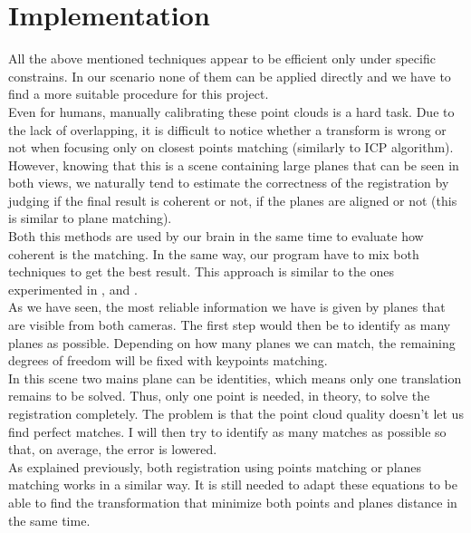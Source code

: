 
\chapter{Implementation} \label{chapt:implementation}

All the above mentioned techniques appear to be efficient only under specific constrains. In our scenario none of them can be applied directly and we have to find a more suitable procedure for this project. \\
Even for humans, manually calibrating these point clouds is a hard task. Due to the lack of overlapping, it is difficult to notice whether a transform is wrong or not when focusing only on closest points matching (similarly to ICP algorithm). However, knowing that this is a scene containing large planes that can be seen in both views, we naturally tend to estimate the correctness of the registration by judging if the final result is coherent or not, if the planes are aligned or not (this is similar to plane matching). \\
Both this methods are used by our brain in the same time to evaluate how coherent is the matching. In the same way, our program have to mix both techniques to get the best result. This approach is similar to the ones experimented in \cite{aravindh}, \cite{mdou2013} and \cite{ytaguchi2013}.\\
\newline
As we have seen, the most reliable information we have is given by planes that are visible from both cameras. The first step would then be to identify as many planes as possible. Depending on how many planes we can match, the remaining degrees of freedom will be fixed with keypoints matching. \\
In this scene two mains plane can be identities, which means only one translation remains to be solved. Thus, only one point is needed, in theory, to solve the registration completely. The problem is that the point cloud quality doesn't let us find perfect matches. I will then try to identify as many matches as possible so that, on average, the error is lowered. \\
\newline
As explained previously, both registration using points matching or planes matching works in a similar way. It is still needed to adapt these equations to be able to find the transformation that minimize both points and planes distance in the same time. 

